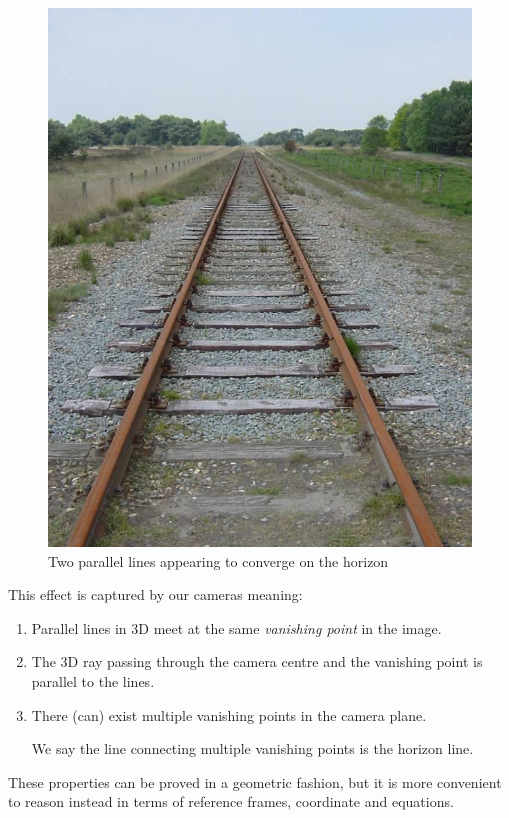 \documentclass{article}
\begin{document}
\begin{figure}[ht]
  \centering
  \includegraphics[scale=0.2]{figures/converge.jpg}
  \caption{\label{fig:converging-lines} Two parallel lines appearing to converge on the horizon}
\end{figure}

This effect is captured by our cameras meaning:

\begin{enumerate}
  \item Parallel lines in 3D meet at the same \textit{vanishing point} in the image.
  \item The 3D ray passing through the camera centre and the vanishing point is parallel to the lines.
  \item There (can) exist multiple vanishing points in the camera plane.

        We say the line connecting multiple vanishing points is the horizon line.
\end{enumerate}

These properties can be proved in a geometric fashion, but it is more convenient to reason instead in terms of reference frames, coordinate and equations.
\end{document}
